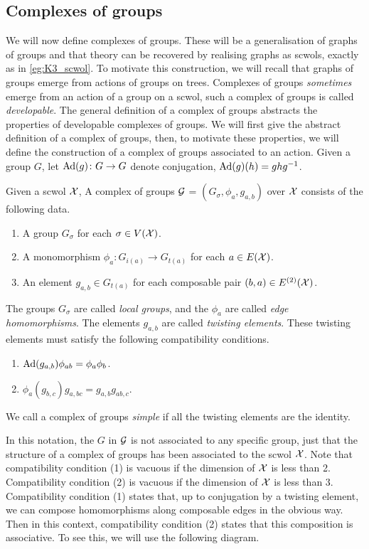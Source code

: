 \subsection{Complexes of groups}
We will now define complexes of groups.
These will be a generalisation of graphs of groups and that theory can be recovered by realising graphs as scwols, exactly as in \cref{eg:K3_scwol}.
To motivate this construction, we will recall that graphs of groups emerge from actions of groups on trees.
Complexes of groups \emph{sometimes} emerge from an action of a group on a scwol, such a complex of groups is called \emph{developable}.
The general definition of a complex of groups abstracts the properties of developable complexes of groups.
We will first give the abstract definition of a complex of groups, then, to motivate these properties, we will define the construction of a complex of groups associated to an action.
Given a group $G$, let $\operatorname{Ad}(g) \colon G \to G$ denote conjugation, $\operatorname{Ad}(g)(h) = ghg^{-1}$.

\begin{definition}
	Given a scwol $\mathcal{X}$, A complex of groups $\mathcal{G}$ = $(G_\sigma, \phi_a, g_{a,b})$ over $\mathcal{X}$ consists of the following data.
	\begin{enumerate}
		\item A group $G_\sigma$ for each $\sigma \in V(\mathcal{X})$.
		\item A monomorphism $\phi_a \colon G_{i(a)} \to G_{t(a)}$ for each $a \in E(\mathcal{X})$.
		\item An element $g_{a,b} \in G_{t(a)}$ for each composable pair $(b,a) \in E^{(2)}(\mathcal{X})$.
	\end{enumerate}
	The groups $G_\sigma$ are called \emph{local groups}, and the $\phi_a$ are called \emph{edge homomorphisms}.
	The elements $g_{a,b}$ are called \emph{twisting elements}.
	These twisting elements must satisfy the following compatibility conditions.
	\begin{enumerate}
		\item $\operatorname{Ad}(g_{a,b}) \phi_{ab} = \phi_a \phi_b$.
		\item $\phi_a(g_{b,c})g_{a,bc} = g_{a,b}g_{ab,c}$.
	\end{enumerate}
	We call a complex of groups \emph{simple} if all the twisting elements are the identity.
	\label{def:complex_of_groups}
\end{definition}

In this notation, the $G$ in $\mathcal{G}$ is not associated to any specific group, just that the structure of a complex of groups has been associated to the scwol $\mathcal{X}$.
Note that compatibility condition (1) is vacuous if the dimension of $\mathcal{X}$ is less than 2.
Compatibility condition (2) is vacuous if the dimension of  $\mathcal{X}$ is less than 3.
Compatibility condition (1) states that, up to conjugation by a twisting element, we can compose homomorphisms along composable edges in the obvious way.
Then in this context, compatibility condition (2) states that this composition is associative.
To see this, we will use the following diagram.

